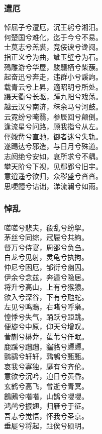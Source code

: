 \documentclass[]{article}
\begin{document}
\hypertarget{header-n390}{%
\subsubsection{遭厄}\label{header-n390}}

悼屈子兮遭厄，沉王躬兮湘汨。\\
何楚国兮难化，迄于今兮不易。\\
士莫志兮羔裘，竞佞谀兮谗阋。\\
指正义兮为曲，訿玉璧兮为石。\\
殦雕游兮华屋，鵔鸃栖兮柴蔟。\\
起奋迅兮奔走，违群小兮謑訽。\\
载青云兮上昇，適昭明兮所处。\\
蹑天衢兮长驱，踵九阳兮戏荡。\\
越云汉兮南济，秣余马兮河鼓。\\
云霓纷兮晻翳，参辰回兮颠倒。\\
逢流星兮问路，顾我指兮从左。\\
俓娵觜兮直驰，御者迷兮失轨。\\
遂踢达兮邪造，与日月兮殊道。\\
志阏绝兮安如，哀所求兮不耦。\\
攀天阶兮下视，见鄢郢兮旧宇。\\
意逍遥兮欲归，众秽盛兮沓沓。\\
思哽饐兮诘诎，涕流澜兮如雨。

\hypertarget{header-n395}{%
\subsubsection{悼乱}\label{header-n395}}

嗟嗟兮悲夫，殽乱兮纷挐。\\
茅丝兮同综，冠屦兮共絇。\\
督万兮侍宴，周邵兮负刍。\\
白龙兮见射，灵龟兮执拘。\\
仲尼兮困厄，邹衍兮幽囚。\\
伊余兮念兹，奔遁兮隐居。\\
将升兮高山，上有兮猴猿。\\
欲入兮深谷，下有兮虺蛇。\\
左见兮鸣鵙，右睹兮呼枭。\\
惶悸兮失气，踊跃兮距跳。\\
便旋兮中原，仰天兮增叹。\\
菅蒯兮楙莽，雚苇兮仟眠。\\
鹿蹊兮躖躖，貒貉兮蟫蟫。\\
鹯鹞兮轩轩，鹑鹌兮甄甄。\\
哀我兮寡独，靡有兮齐伦。\\
意欲兮沉吟，迫日兮黄昏。\\
玄鹤兮高飞，曾逝兮青冥。\\
鶬鶊兮喈喈，山鹊兮嚶嚶。\\
鸿鸬兮振翅，归雁兮于征。\\
吾志兮觉悟，怀我兮圣京。\\
垂屣兮将起，跓俟兮硕明。
\end{document}
